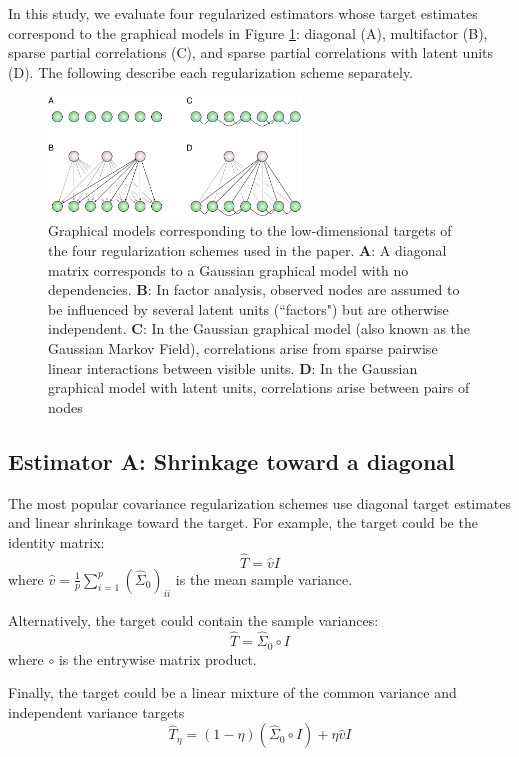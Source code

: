 In this study, we evaluate four regularized estimators whose target estimates correspond to the graphical models in Figure \ref{fig:02}: diagonal (A), multifactor (B), sparse partial correlations (C), and sparse  partial correlations with latent units (D).  The following describe each regularization scheme separately.

\begin{figure}
\centering
\includegraphics[width=0.6\textwidth]{figures/Figure2.pdf}
\caption{
Graphical models corresponding to the low-dimensional targets of the four regularization schemes used in the paper.
\textbf{A}: A diagonal matrix corresponds to a Gaussian graphical model with no dependencies. 
\textbf{B}: In factor analysis, observed nodes are assumed to be influenced by several latent units (``factors") but are otherwise independent. 
\textbf{C}: In the Gaussian graphical model (also known as the Gaussian Markov Field), correlations arise from sparse pairwise linear interactions between visible units. 
\textbf{D}: In the Gaussian graphical model with latent units, correlations arise  between pairs of nodes 
}\label{fig:02}
\end{figure}

\subsection{Estimator A: Shrinkage toward a diagonal}
The most popular covariance regularization schemes use diagonal target estimates and linear shrinkage toward the target.  For example, the target could be the identity matrix:  
\begin{equation}
\hat T = \hat v I
\end{equation}
where $\hat v = \frac 1 p \sum\limits_{i=1}^p(\hat\Sigma_0)_{ii}$ is the mean sample variance. 

Alternatively, the target could contain the sample variances:
\begin{equation}
\hat T= \hat\Sigma_0 \circ I 
\end{equation}
where $\circ$ is the entrywise matrix product.

Finally, the target could be a linear mixture of the common variance and independent variance targets
\begin{equation}
\hat T_\eta = (1-\eta)(\hat\Sigma_0 \circ I) + \eta\hat v I
\end{equation}

